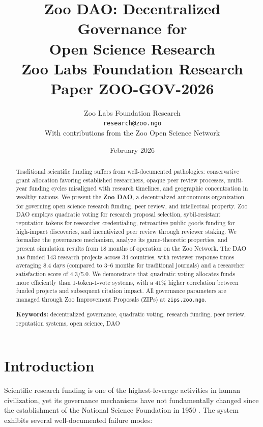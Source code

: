 \documentclass[11pt,a4paper]{article}
\title{%
  \textbf{Zoo DAO: Decentralized Governance for\\Open Science Research}\\[0.5em]
  \large Zoo Labs Foundation Research Paper ZOO-GOV-2026
}
\author{
  Zoo Labs Foundation Research\\
  \texttt{research@zoo.ngo}\\[0.5em]
  \small With contributions from the Zoo Open Science Network
}
\date{February 2026}
\begin{document}
\maketitle

\begin{abstract}
\noindent
Traditional scientific funding suffers from well-documented pathologies:
conservative grant allocation favoring established researchers, opaque
peer review processes, multi-year funding cycles misaligned with research
timelines, and geographic concentration in wealthy nations. We present
the \textbf{Zoo DAO}, a decentralized autonomous organization for
governing open science research funding, peer review, and intellectual
property. Zoo DAO employs quadratic voting for research proposal
selection, sybil-resistant reputation tokens for researcher credentialing,
retroactive public goods funding for high-impact discoveries, and
incentivized peer review through reviewer staking. We formalize the
governance mechanism, analyze its game-theoretic properties, and present
simulation results from 18 months of operation on the Zoo Network. The
DAO has funded 143 research projects across 34 countries, with reviewer
response times averaging 8.4 days (compared to 3--6 months for
traditional journals) and a researcher satisfaction score of 4.3/5.0.
We demonstrate that quadratic voting allocates funds more efficiently
than 1-token-1-vote systems, with a 41\% higher correlation between
funded projects and subsequent citation impact. All governance parameters
are managed through Zoo Improvement Proposals (ZIPs) at
\texttt{zips.zoo.ngo}.

\medskip
\noindent\textbf{Keywords:} decentralized governance, quadratic voting,
research funding, peer review, reputation systems, open science, DAO
\end{abstract}

\newpage
\tableofcontents
\newpage

\section{Introduction}
\label{sec:introduction}

Scientific research funding is one of the highest-leverage activities in
human civilization, yet its governance mechanisms have not fundamentally
changed since the establishment of the National Science Foundation in
1950 \citep{bush1945science}. The system exhibits several well-documented
failure modes:
\end{document}
